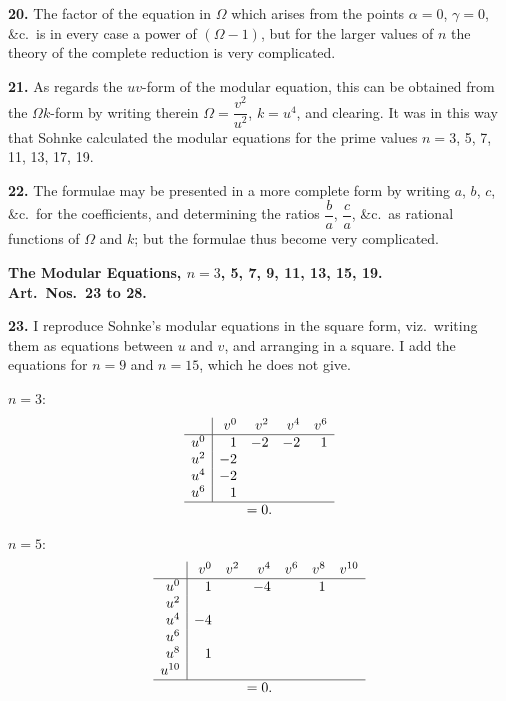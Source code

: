 \documentclass[11pt,a4paper]{book}
\begin{document}
\medskip
\noindent\textbf{20.} The factor of the equation in $\Omega$ which arises from the points $\alpha = 0$, $\gamma = 0$, \&c.\ is in every case a power of $(\Omega - 1)$, but for the larger values of $n$ the theory of the complete reduction is very complicated.

\medskip
\noindent\textbf{21.} As regards the $uv$-form of the modular equation, this can be obtained from the $\Omega k$-form by writing therein $\Omega = \dfrac{v^2}{u^2}$, $k = u^4$, and clearing. It was in this way that Sohnke calculated the modular equations for the prime values $n = 3$, 5, 7, 11, 13, 17, 19.

\medskip
\noindent\textbf{22.} The formulae may be presented in a more complete form by writing $a$, $b$, $c$, \&c.\ for the coefficients, and determining the ratios $\dfrac{b}{a}$, $\dfrac{c}{a}$, \&c.\ as rational functions of $\Omega$ and $k$; but the formulae thus become very complicated.

\medskip
\noindent\textbf{The Modular Equations, $n = 3$, 5, 7, 9, 11, 13, 15, 19.}\\
\textbf{Art.~Nos.~23 to 28.}

\medskip
\noindent\textbf{23.} I reproduce Sohnke's modular equations in the square form, viz.\ writing them as equations between $u$ and $v$, and arranging in a square. I add the equations for $n = 9$ and $n = 15$, which he does not give.

\medskip
$n = 3$:
\[
\begin{array}{r|rrrr}
& v^0 & v^2 & v^4 & v^6 \\
\hline
u^0 & 1 & -2 & -2 & 1 \\
u^2 & -2 & & & \\
u^4 & -2 & & & \\
u^6 & 1 & & & \\
\hline
\multicolumn{5}{c}{= 0.}
\end{array}
\]

$n = 5$:
\[
\begin{array}{r|rrrrrr}
& v^0 & v^2 & v^4 & v^6 & v^8 & v^{10} \\
\hline
u^0 & 1 & & -4 & & 1 & \\
u^2 & & & & & & \\
u^4 & -4 & & & & & \\
u^6 & & & & & & \\
u^8 & 1 & & & & & \\
u^{10} & & & & & & \\
\hline
\multicolumn{7}{c}{= 0.}
\end{array}
\]
\end{document}

